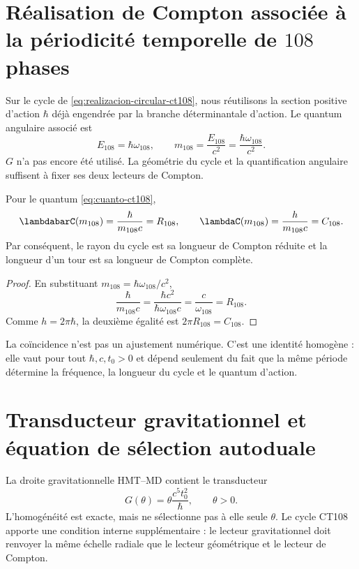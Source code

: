 \label{chap:planck-autodual}

\section{Réalisation de Compton associée à la périodicité temporelle de \(108\) phases}

Sur le cycle de \cref{eq:realizacion-circular-ct108}, nous réutilisons la section
positive d’action \(\hbar\) déjà engendrée par la branche déterminantale d’action.
Le quantum angulaire associé est
\begin{equation}
E_{108}=\hbar\omega_{108},
\qquad
m_{108}=\frac{E_{108}}{c^2}
=\frac{\hbar\omega_{108}}{c^2}.
\label{eq:cuanto-ct108}
\end{equation}
\(G\) n’a pas encore été utilisé. La géométrie du cycle et la quantification
angulaire suffisent à fixer ses deux lecteurs de Compton.

\begin{theorem}
\label{thm:ct108-compton}
Pour le quantum \eqref{eq:cuanto-ct108},
\begin{equation}
\lambdabarC(m_{108})=\frac{\hbar}{m_{108}c}=R_{108},
\qquad
\lambdaC(m_{108})=\frac{h}{m_{108}c}=C_{108}.
\label{eq:identidad-ct108-compton}
\end{equation}
Par conséquent, le rayon du cycle est sa longueur de Compton réduite et la
longueur d’un tour est sa longueur de Compton complète.
\end{theorem}

\begin{proof}
En substituant \(m_{108}=\hbar\omega_{108}/c^2\),
\[
\frac{\hbar}{m_{108}c}
=\frac{\hbar c^2}{\hbar\omega_{108}c}
=\frac{c}{\omega_{108}}=R_{108}.
\]
Comme \(h=2\pi\hbar\), la deuxième égalité est \(2\pi R_{108}=C_{108}\).
\end{proof}

La coïncidence n’est pas un ajustement numérique. C’est une identité homogène : elle vaut
pour tout \(\hbar,c,t_0>0\) et dépend seulement du fait que la même période détermine
la fréquence, la longueur du cycle et le quantum d’action.

\section{Transducteur gravitationnel et équation de sélection autoduale}

La droite gravitationnelle HMT--MD contient le transducteur
\begin{equation}
G(\theta)=\theta\frac{c^5t_0^2}{\hbar},
\qquad \theta>0.
\label{eq:transductor-g-planck-anexo}
\end{equation}
L’homogénéité est exacte, mais ne sélectionne pas à elle seule \(\theta\). Le
cycle CT108 apporte une condition interne supplémentaire : le lecteur gravitationnel
doit renvoyer la même échelle radiale que le lecteur géométrique et le lecteur de
Compton.

